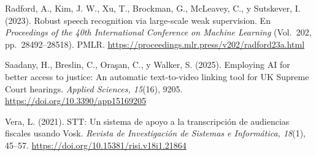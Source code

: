 \documentclass[12pt,a4paper,oneside]{article}
\begin{document}
\begin{enumerate}[label={[\arabic*]}, leftmargin=1.25cm, itemsep=6pt]
  \item Radford, A., Kim, J. W., Xu, T., Brockman, G., McLeavey, C., y Sutskever, I. (2023). Robust speech recognition via large-scale weak supervision. En \textit{Proceedings of the 40th International Conference on Machine Learning} (Vol.~202, pp.~28492--28518). PMLR. \url{https://proceedings.mlr.press/v202/radford23a.html}

  \item Saadany, H., Breslin, C., Ora\c{s}an, C., y Walker, S. (2025). Employing AI for better access to justice: An automatic text-to-video linking tool for UK Supreme Court hearings. \textit{Applied Sciences, 15}(16), 9205. \url{https://doi.org/10.3390/app15169205}

  \item Vera, L. (2021). STT: Un sistema de apoyo a la transcripci\'on de audiencias fiscales usando Vosk. \textit{Revista de Investigaci\'on de Sistemas e Inform\'atica, 18}(1), 45--57. \url{https://doi.org/10.15381/risi.v18i1.21864}

\end{enumerate}
\end{document}
